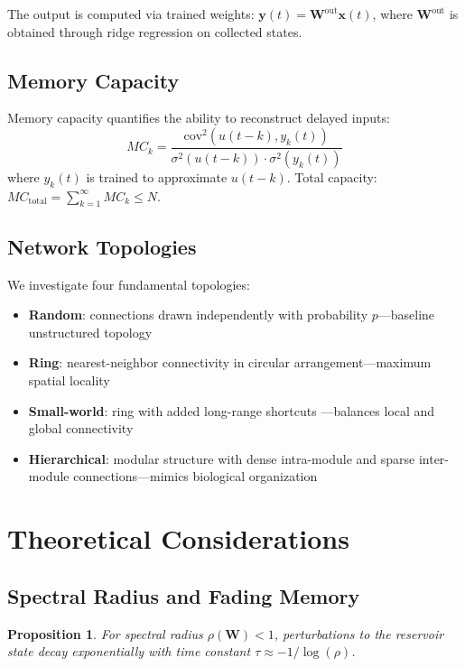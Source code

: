 \documentclass{article}
\newtheorem{proposition}[theorem]{Proposition}
\begin{document}
The output is computed via trained weights: $\mathbf{y}(t) = \mathbf{W}^{\text{out}}\mathbf{x}(t)$, where $\mathbf{W}^{\text{out}}$ is obtained through ridge regression on collected states.

\subsection{Memory Capacity}

Memory capacity \cite{jaeger2001short} quantifies the ability to reconstruct delayed inputs:
\begin{equation}
MC_k = \frac{\text{cov}^2(u(t-k), y_k(t))}{\sigma^2(u(t-k)) \cdot \sigma^2(y_k(t))}
\end{equation}
where $y_k(t)$ is trained to approximate $u(t-k)$. Total capacity: $MC_{\text{total}} = \sum_{k=1}^{\infty} MC_k \leq N$.

\subsection{Network Topologies}

We investigate four fundamental topologies:

\begin{itemize}
\item \textbf{Random}: connections drawn independently with probability $p$—baseline unstructured topology
\item \textbf{Ring}: nearest-neighbor connectivity in circular arrangement—maximum spatial locality
\item \textbf{Small-world}: ring with added long-range shortcuts \cite{watts1998collective}—balances local and global connectivity
\item \textbf{Hierarchical}: modular structure with dense intra-module and sparse inter-module connections—mimics biological organization
\end{itemize}

\section{Theoretical Considerations}

\subsection{Spectral Radius and Fading Memory}

\begin{proposition}
For spectral radius $\rho(\mathbf{W}) < 1$, perturbations to the reservoir state decay exponentially with time constant $\tau \approx -1/\log(\rho)$.
\end{proposition}
\end{document}
